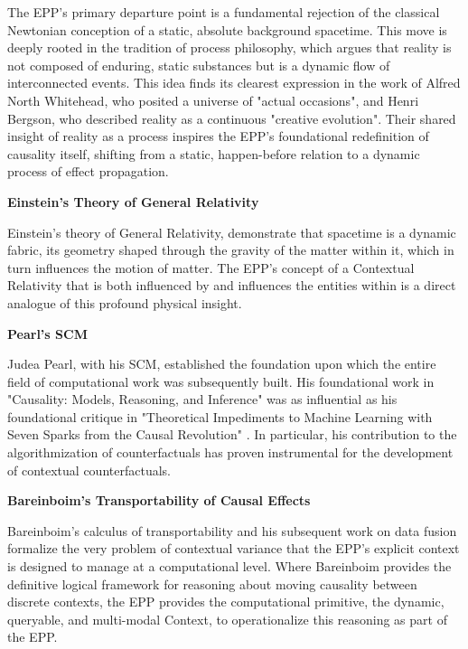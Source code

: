 The EPP's primary departure point is a fundamental rejection of the classical Newtonian conception of a static, absolute background spacetime. This move is deeply rooted in the tradition of process philosophy, which argues that reality is not composed of enduring, static substances but is a dynamic flow of interconnected events. This idea finds its clearest expression in the work of Alfred North Whitehead, who posited a universe of "actual occasions"\cite{whitehead2010process}, and Henri Bergson, who described reality as a continuous "creative evolution"\cite{bergson2022creative}. Their shared insight of reality as a process inspires the EPP's foundational redefinition of causality itself, shifting from a static, happen-before relation to a dynamic process of effect propagation.

\newpage

\textbf{Einstein's Theory of General Relativity}

Einstein's theory of General Relativity\cite{EinsteinPapers1915}, demonstrate that spacetime is a dynamic fabric, 
its geometry shaped through the gravity of the matter within it, which in turn influences the motion of matter. 
The EPP's concept of a Contextual Relativity that is both influenced by and influences the entities within 
is a direct analogue of this profound physical insight.

\textbf{Pearl's SCM}

Judea Pearl, with his SCM, established the foundation upon which the entire field of computational work was subsequently built. His foundational work in "Causality: Models, Reasoning, and Inference" \cite{pearl2000causality} was as influential as his foundational critique in "Theoretical Impediments to Machine Learning with Seven Sparks from the Causal Revolution" \cite{pearl2018theoretical}. In particular, his contribution to the algorithmization of counterfactuals has proven instrumental for the development of contextual counterfactuals.

\textbf{Bareinboim's Transportability of Causal Effects}

Bareinboim's calculus of transportability \cite{bareinboim2012transportability} and his subsequent work on data fusion formalize the very problem of contextual variance that the EPP's explicit context is designed to manage at a computational level. Where Bareinboim provides the definitive logical framework for reasoning about moving causality between discrete contexts, the EPP provides the computational primitive, the dynamic, queryable, and multi-modal Context, to operationalize this reasoning as part of the EPP.


